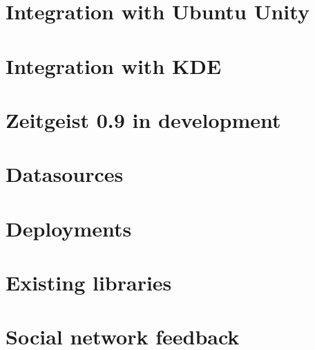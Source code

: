 \section{Integration with Ubuntu Unity}
\section{Integration with KDE}
\section{Zeitgeist 0.9 in development}
\section{Datasources}
\section{Deployments}
\section{Existing libraries}
\section{Social network feedback}
